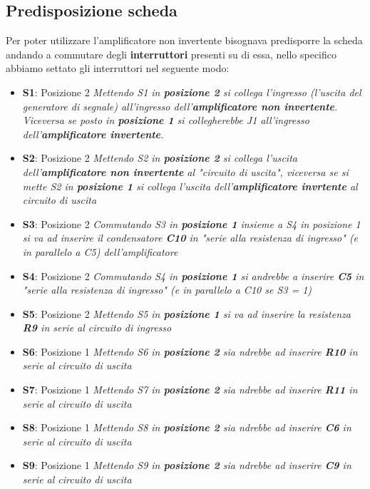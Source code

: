 \documentclass{article}
\begin{document}
\subsection{Predisposizione scheda}
Per poter utilizzare l'amplificatore non invertente bisognava predisporre la scheda andando a commutare degli \textbf{interruttori} presenti su di essa, nello specifico abbiamo settato gli interruttori nel seguente modo:
\begin{itemize}
	\item \textbf{S1}: Posizione 2 \textit{Mettendo S1 in \textbf{posizione 2} si collega l'ingresso (l'uscita del generatore di segnale) all'ingresso dell'\textbf{amplificatore non invertente}.\\Viceversa se posto in \textbf{posizione 1} si collegherebbe J1 all'ingresso dell'\textbf{amplificatore invertente}.}
	\item \textbf{S2}: Posizione 2 \textit{Mettendo S2 in \textbf{posizione 2} si collega l'uscita dell'\textbf{amplificatore non invertente} al "circuito di uscita", viceversa se si mette S2 in \textbf{posizione 1} si collega l'uscita dell'\textbf{amplificatore invrtente} al circuito di uscita}
	\item \textbf{S3}: Posizione 2 \textit{Commutando S3 in \textbf{posizione 1} insieme a S4 in posizione 1 si va ad inserire il condensatore \textbf{C10} in "serie alla resistenza di ingresso" (e in parallelo a C5) dell'amplificatore}
	\item \textbf{S4}: Posizione 2 \textit{Commutando S4 in \textbf{posizione 1} si andrebbe a inserire \textbf{C5} in "serie alla resistenza di ingresso" (e in parallelo a C10 se S3 = 1)}
	\item \textbf{S5}: Posizione 2
	\textit{Mettendo S5 in \textbf{posizione 1} si va ad inserire la resistenza \textbf{R9} in serie al circuito di ingresso}
	\item \textbf{S6}: Posizione 1
	 \textit{Mettendo S6 in \textbf{posizione 2} sia ndrebbe ad inserire \textbf{R10} in serie al circuito di uscita}
	\item \textbf{S7}: Posizione 1
	 \textit{Mettendo S7 in \textbf{posizione 2} sia ndrebbe ad inserire \textbf{R11} in serie al circuito di uscita}
	\item \textbf{S8}: Posizione 1
	 \textit{Mettendo S8 in \textbf{posizione 2} sia ndrebbe ad inserire \textbf{C6} in serie al circuito di uscita}
	\item \textbf{S9}: Posizione 1
	 \textit{Mettendo S9 in \textbf{posizione 2} sia ndrebbe ad inserire \textbf{C9} in serie al circuito di uscita}
\end{itemize}
\end{document}
